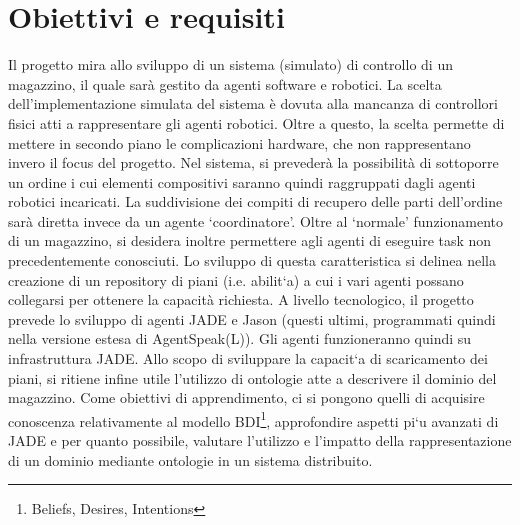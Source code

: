 \section{Obiettivi e requisiti}
Il progetto mira allo sviluppo di un sistema (simulato) di controllo di un magazzino, il quale sarà gestito da agenti software e robotici. La scelta dell’implementazione simulata del sistema è dovuta alla mancanza di controllori fisici atti a rappresentare gli agenti robotici. Oltre a questo, la scelta permette di mettere in secondo piano le complicazioni
hardware, che non rappresentano invero il focus del progetto.
\parag
Nel sistema, si prevederà la possibilità di sottoporre un ordine i cui elementi compositivi saranno quindi raggruppati dagli agenti robotici incaricati. La suddivisione dei compiti di recupero delle parti dell'ordine sarà diretta invece da un agente `coordinatore'.\newline
Oltre al `normale' funzionamento di un magazzino, si desidera inoltre permettere agli agenti di eseguire task non precedentemente conosciuti. Lo sviluppo di questa caratteristica si delinea nella creazione di un repository di piani (i.e. abilit`a) a cui i vari agenti possano collegarsi per ottenere la capacità richiesta.
\parag
A livello tecnologico, il progetto prevede lo sviluppo di agenti JADE e Jason (questi ultimi, programmati quindi nella versione estesa di AgentSpeak(L)). Gli agenti funzioneranno quindi su infrastruttura JADE.
Allo scopo di sviluppare la capacit`a di scaricamento dei piani, si ritiene infine utile l’utilizzo di ontologie atte a descrivere il dominio del magazzino.
\parag
Come obiettivi di apprendimento, ci si pongono quelli di acquisire conoscenza relativamente al modello BDI\footnote{Beliefs, Desires, Intentions}, approfondire aspetti pi`u avanzati di JADE e per quanto
possibile, valutare l'utilizzo e l'impatto della rappresentazione di un dominio mediante ontologie in un sistema distribuito.

